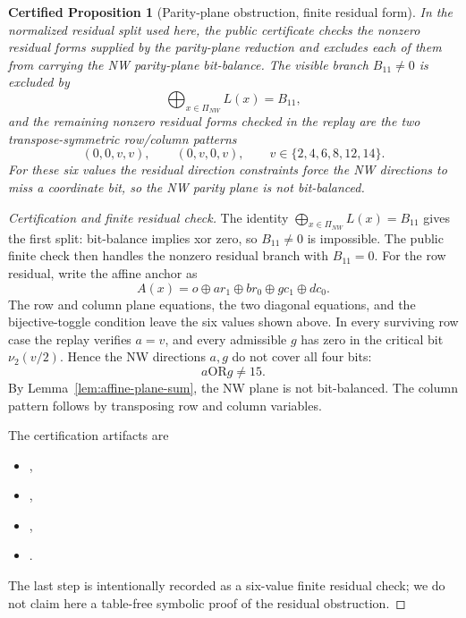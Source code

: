 \documentclass[11pt,a4paper]{article}
\newtheorem{certprop}[theorem]{Certified Proposition}
\theoremstyle{definition}
\theoremstyle{remark}
\begin{document}
\begin{certprop}[Parity-plane obstruction, finite residual form]
\label{prop:parity-plane-mechanism}
In the normalized residual split used here, the public certificate checks the
nonzero residual forms supplied by the parity-plane reduction and excludes each
of them from carrying the NW parity-plane bit-balance.  The visible branch
\(B_{11}\ne0\) is excluded by
\[
\bigoplus_{x\in\Pi_{NW}} L(x)=B_{11},
\]
and the remaining nonzero residual forms checked in the replay are the two
transpose-symmetric row/column patterns
\[
(0,0,v,v),\qquad (0,v,0,v),
\qquad v\in\{2,4,6,8,12,14\}.
\]
For these six values the residual direction constraints force the NW
directions to miss a coordinate bit, so the NW parity plane is not
bit-balanced.
\end{certprop}

\begin{proof}[Certification and finite residual check]
The identity \(\bigoplus_{x\in\Pi_{NW}}L(x)=B_{11}\) gives the first split:
bit-balance implies xor zero, so \(B_{11}\ne0\) is impossible.  The public
finite check then handles the nonzero residual branch with \(B_{11}=0\).  For
the row residual, write the affine anchor as
\[
A(x)=o\oplus a r_1\oplus b r_0\oplus g c_1\oplus d c_0.
\]
The row and column plane equations, the two diagonal equations, and the
bijective-toggle condition leave the six values shown above.  In every
surviving row case the replay verifies \(a=v\), and every admissible \(g\) has
zero in the critical bit \(\nu_2(v/2)\).  Hence the NW directions \(a,g\) do
not cover all four bits:
\[
a\mathbin{\mathrm{OR}}g\ne15.
\]
By Lemma~\ref{lem:affine-plane-sum}, the NW plane is not bit-balanced.  The
column pattern follows by transposing row and column variables.

The certification artifacts are
\begin{itemize}[leftmargin=*]
\item {},
\item {},
\item {},
\item {}.
\end{itemize}
The last step is intentionally recorded as a six-value finite residual check;
we do not claim here a table-free symbolic proof of the residual obstruction.
\end{proof}
\end{document}
